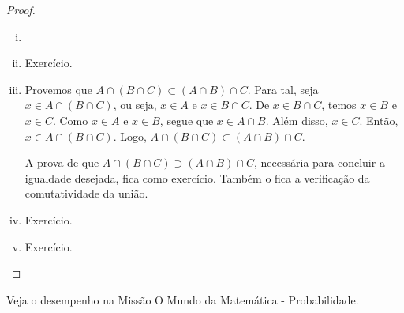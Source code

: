 \begin{proof}
\begin{enumerate}[i)]
\item[]
\item Exercício.
\item
Provemos que $A \cap (B \cap C) \subset (A \cap B) \cap C$.
Para tal, seja $x \in A \cap (B \cap C)$, ou seja, $x \in A$ e $x \in B \cap C$.
De $x \in B \cap C$, temos $x \in B$ e $x \in C$.
Como $x \in A$ e $x \in B$, segue que $x \in A \cap B$.
Além disso, $x \in C$.
Então, $x \in A \cap (B \cap C)$.
Logo, $A \cap (B \cap C) \subset (A \cap B) \cap C$. 

A prova de que $A \cap (B \cap C) \supset (A \cap B) \cap C$, necessária para concluir a igualdade desejada, fica como exercício. Também o fica a verificação da comutatividade da união.
\item Exercício.
\item Exercício.
\end{enumerate}
\end{proof}

\begin{onlineact}
Veja o desempenho na Missão O Mundo da Matemática - Probabilidade.
\end{onlineact}


